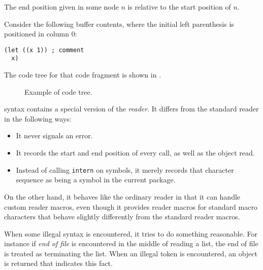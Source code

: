 The end position given in some node $n$ is relative to the start
position of $n$.

Consider the following buffer contents, where the initial left
parenthesis is positioned in column $0$:

\begin{verbatim}
(let ((x 1)) ; comment
  x)
\end{verbatim}

The code tree for that code fragment is shown in .

\begin{figure}
\begin{center}
\end{center}
\caption{\label{fig-code-tree}
Example of code tree.}
\end{figure}

\commonlisp{} syntax contains a special version of the \commonlisp{}
\emph{reader}.  It differs from the standard reader in the following
ways:

\begin{itemize}
\item It never signals an error.
\item It records the start and end position of every call, as well as
  the object read.
\item Instead of calling \texttt{intern} on symbols, it merely records
  that character sequence as being a symbol in the current package. 
\end{itemize}

On the other hand, it behaves like the ordinary \commonlisp{} reader
in that it can handle custom reader macros, even though it provides
reader macros for standard macro characters that behave slightly
differently from the standard reader macros.

When some illegal syntax is encountered, it tries to do something
reasonable.  For instance if \emph{end of file} is encountered in the
middle of reading a list, the end of file is treated as terminating
the list.  When an illegal token is encountered, an object is returned
that indicates this fact. 


